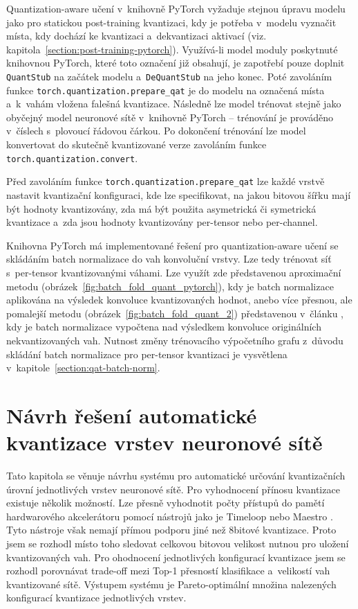 Quantization-aware učení v~knihovně PyTorch vyžaduje stejnou úpravu modelu jako pro statickou post-training kvantizaci, kdy je potřeba v~modelu vyznačit místa, kdy dochází ke kvantizaci a~dekvantizaci aktivací (viz. kapitola~\ref{section:post-training-pytorch}). Využívá-li model moduly poskytnuté knihovnou PyTorch, které toto označení již obsahují, je zapotřebí pouze doplnit \verb|QuantStub| na začátek modelu a~\verb|DeQuantStub| na jeho konec. Poté zavoláním funkce \verb|torch.quantization.prepare_qat| je do modelu na označená místa a~k~vahám vložena falešná kvantizace. Následně lze model trénovat stejně jako obyčejný model neuronové sítě v~knihovně PyTorch -- trénování je prováděno v~číslech s~plovoucí řádovou čárkou. Po dokončení trénování lze model konvertovat do skutečně kvantizované verze zavoláním funkce \verb|torch.quantization.convert|. 

Před zavoláním funkce \verb|torch.quantization.prepare_qat| lze každé vrstvě nastavit kvantizační konfiguraci, kde lze specifikovat, na jakou bitovou šířku mají být hodnoty kvantizovány, zda má být použita asymetrická či symetrická kvantizace a~zda jsou hodnoty kvantizovány per-tensor nebo per-channel.

Knihovna PyTorch má implementované řešení pro quantization-aware učení se skládáním batch normalizace do vah konvoluční vrstvy. Lze tedy trénovat síť s~per-tensor kvantizovanými váhami. 
Lze využít zde představenou aproximační metodu (obrázek~\ref{fig:batch_fold_quant_pytorch}), kdy je batch normalizace aplikována na výsledek konvoluce kvantizovaných hodnot, anebo více přesnou, ale pomalejší metodu (obrázek~\ref{fig:batch_fold_quant_2}) představenou v~článku \cite{krishnamoorthi2018quantizing}, kdy je batch normalizace vypočtena nad výsledkem konvoluce originálních nekvantizovaných vah. Nutnost změny trénovacího výpočetního grafu z~důvodu skládání batch normalizace pro per-tensor kvantizaci je vysvětlena v~kapitole~\ref{section:qat-batch-norm}. 

\chapter{Návrh řešení automatické kvantizace vrstev neuronové sítě}
\label{section:system-design}

Tato kapitola se věnuje návrhu systému pro automatické určování kvantizačních úrovní jednotlivých vrstev neuronové sítě. Pro vyhodnocení přínosu kvantizace existuje několik možností. Lze přesně vyhodnotit počty přístupů do pamětí hardwarového akcelerátoru pomocí nástrojů jako je Timeloop \cite{8695666} nebo Maestro \cite{9076333}. Tyto nástroje však nemají přímou podporu jiné než 8bitové kvantizace. Proto jsem se rozhodl místo toho sledovat celkovou bitovou velikost nutnou pro uložení kvantizovaných vah. Pro ohodnocení jednotlivých konfigurací kvantizace jsem se rozhodl porovnávat trade-off mezi Top-1 přesností klasifikace a~velikostí vah kvantizované sítě. Výstupem systému je Pareto-optimální množina nalezených konfigurací kvantizace jednotlivých vrstev.

